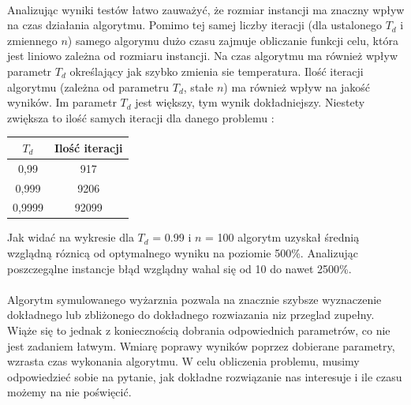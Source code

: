 \documentclass[wide,a4paper,titlepage,12pt] {article}
\begin{document}
\paragraph{}
Analizując wyniki testów łatwo zauważyć, że rozmiar instancji ma znaczny wpływ na czas działania algorytmu. Pomimo tej samej liczby iteracji (dla ustalonego $T_d$ i zmiennego $n$) samego algorymu dużo czasu zajmuje obliczanie funkcji celu, która jest liniowo zależna od rozmiaru instancji. Na czas algorytmu ma również wpływ parametr $T_{d}$ określający jak szybko zmienia sie temperatura. Ilość iteracji algorytmu (zależna od parametru $T_d$, stałe $n$) ma również wpływ na jakość wyników. Im parametr $T_d$ jest większy, tym wynik dokładniejszy. Niestety zwiększa to ilość samych iteracji dla danego problemu : \\
\begin{center}
    \begin{tabular}{|c|c|}
      \hline
       $T_{d}$ & Ilość iteracji \\ \hline
       0,99 & 917 \\ \hline
       0,999 & 9206 \\ \hline
       0,9999 & 92099  \\ \hline
  \end{tabular}
\end{center}
Jak widać na wykresie dla $T_d$ = 0.99 i $n$ = 100 algorytm uzyskał średnią wzglądną róznicą od optymalnego wyniku na poziomie 500\%. Analizując poszczegąlne instancje błąd wzglądny wahal się od 10 do nawet 2500\%.
\paragraph{}
Algorytm symulowanego wyżarznia pozwala na znacznie szybsze wyznaczenie dokładnego lub zbliżonego do dokładnego rozwiazania niz przeglad zupełny. Wiąże się to jednak z koniecznością dobrania odpowiednich parametrów, co nie jest zadaniem łatwym. Wmiarę poprawy wyników poprzez dobierane parametry, wzrasta czas wykonania algorytmu. W celu obliczenia problemu, musimy odpowiedzieć sobie na pytanie, jak dokładne rozwiązanie nas interesuje i ile czasu możemy na nie poświęcić.  
\end{document}
